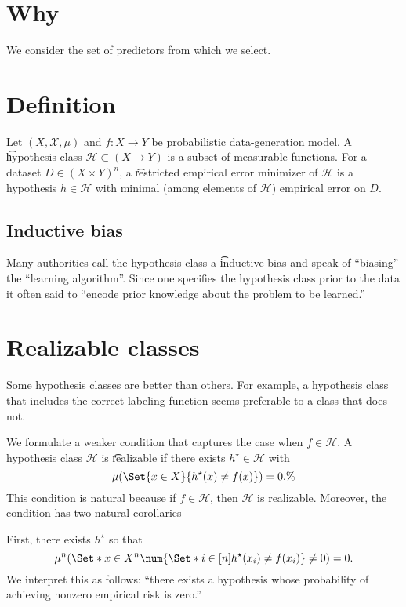 

\section*{Why}

We consider the set of predictors from which we select.

\section*{Definition}

Let $(X, \mathcal{X} , \mu )$ and $f: X \to Y$ be probabilistic data-generation model.
A \t{hypothesis class} $\mathcal{H}  \subset (X \to Y)$ is a subset of measurable functions.
For a dataset $D \in (X \times  Y)^n$, a \t{restricted empirical error minimizer} of $\mathcal{H} $ is a hypothesis $h \in \mathcal{H} $ with minimal (among elements of $\mathcal{H} $) empirical error on $D$.

\subsection*{Inductive bias}

Many authorities call the hypothesis class a \t{inductive bias} and speak of ``biasing'' the ``learning algorithm''.
Since one specifies the hypothesis class prior to the data it often said to ``encode prior knowledge about the problem to be learned.''

\section*{Realizable classes}

Some hypothesis classes are better than others.
For example, a hypothesis class that includes the correct labeling function seems preferable to a class that does not.

We formulate a weaker condition that captures the case when $f \in \mathcal{H} $.
A hypothesis class $\mathcal{H} $ is \t{realizable} if there exists $h^{\star} \in \mathcal{H} $ with
\[
\mu (\Set{x \in X}{h^\star(x) \neq f(x)}) = 0.\%
\]
This condition is natural because if $f \in \mathcal{H} $, then $\mathcal{H} $ is realizable.
Moreover, the condition has two natural corollaries

First, there exists $h^\star$ so that
\[
\mu ^n(\Set*{x \in X^n}{\num{\Set*{i \in [n]}{h^\star(x_i) \neq f(x_i)}} \neq 0}) = 0.
\]
We interpret this as follows: ``there exists a hypothesis whose probability of achieving nonzero empirical risk is zero.''

